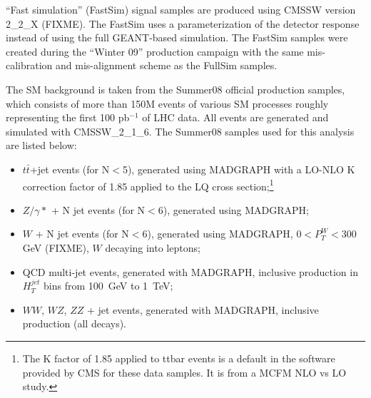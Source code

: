 ``Fast simulation'' (FastSim) signal samples are produced using CMSSW version 2\_2\_X (FIXME). The FastSim uses a parameterization
of the detector response instead of using the full GEANT-based simulation.
The FastSim samples were created during the ``Winter 09'' production campaign with the same mis-calibration 
and mis-alignment scheme as the FullSim samples.

The SM background is taken from the Summer08 official production samples,
which consists of more than 150M events of various SM processes roughly representing the first 100 pb$^{-1}$ of LHC data.
All events are generated and simulated with CMSSW\_2\_1\_6. 
The Summer08 samples used for this analysis are listed below:
\begin{itemize}
%
\item $t\bar{t}$+jet events (for N$<$5), generated using MADGRAPH \cite{Mangano:2002ea} with a 
LO-NLO K correction factor of 1.85 applied 
to the LQ cross section;\footnote{The K factor of 1.85 applied to ttbar events is a default in the software provided by CMS for 
 these data samples.  It is from a MCFM NLO vs LO study.}
%
\item $Z/\gamma*$ + N jet events (for N$<$6), generated using MADGRAPH;  
%
\item $W$ + N jet events (for N$<$6), generated using MADGRAPH, $ 0 < P_{T}^{W} < 300 $ GeV (FIXME), $W$ decaying into leptons;  
%
\item QCD multi-jet events, generated with MADGRAPH, inclusive production in $H_{T}^{jet}$ bins from 100~GeV to 1~TeV;  
%
%
\item $WW$, $WZ$, $ZZ$ + jet events, generated with MADGRAPH, inclusive production (all decays).
\end{itemize} 


